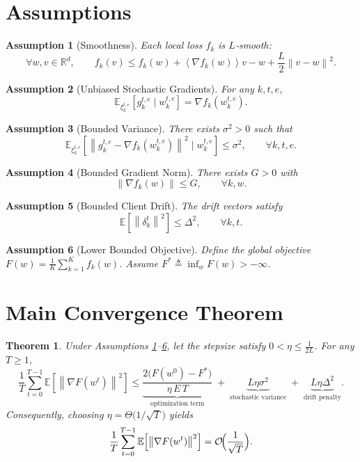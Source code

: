 \documentclass{article}
\newtheorem{theorem}{Theorem}
\newtheorem{assumption}{Assumption}
\newcommand{\E}{\mathbb{E}}
\newcommand{\norm}[1]{\left\lVert#1\right\rVert}
\newcommand{\inner}[1]{\left\langle#1\right\rangle}
\begin{document}
\section*{Assumptions}
\begin{assumption}[Smoothness]\label{ass:smooth}
Each local loss $f_{k}$ is $L$‑smooth:
\[
    \forall w,v\in\mathbb{R}^{d},\qquad
    f_{k}(v)\le f_{k}(w)+\inner{\nabla f_{k}(w)}{v-w}+ \frac{L}{2}\norm{v-w}^{2}.
\]
\end{assumption}

\begin{assumption}[Unbiased Stochastic Gradients]\label{ass:unbiased}
For any $k,t,e$,
\[
    \E_{\xi_{k}^{t,e}}\!\left[g_{k}^{t,e}\mid w_{k}^{t,e}\right]=\nabla f_{k}\!\left(w_{k}^{t,e}\right).
\]
\end{assumption}

\begin{assumption}[Bounded Variance]\label{ass:var}
There exists $\sigma^{2}>0$ such that
\[
    \E_{\xi_{k}^{t,e}}\!\left[\norm{g_{k}^{t,e}-\nabla f_{k}(w_{k}^{t,e})}^{2}\mid w_{k}^{t,e}\right]\le\sigma^{2},
    \qquad\forall k,t,e.
\]
\end{assumption}

\begin{assumption}[Bounded Gradient Norm]\label{ass:grad}
There exists $G>0$ with
\[
    \norm{\nabla f_{k}(w)}\le G,\qquad\forall k,w.
\]
\end{assumption}

\begin{assumption}[Bounded Client Drift]\label{ass:drift}
The drift vectors satisfy
\[
    \E\!\left[\norm{\delta_{k}^{t}}^{2}\right]\le \Delta^{2},
    \qquad\forall k,t.
\]
\end{assumption}

\begin{assumption}[Lower Bounded Objective]\label{ass:lower}
Define the global objective $F(w)=\frac1K\sum_{k=1}^{K}f_{k}(w)$.  Assume $F^{*}\triangleq\inf_{w}F(w)>-\infty$.
\end{assumption}

\section*{Main Convergence Theorem}
\begin{theorem}\label{thm:main}
Under Assumptions \ref{ass:smooth}--\ref{ass:lower}, let the stepsize satisfy $0<\eta\le\frac{1}{2L}$.  For any $T\ge1$,
\[
\frac{1}{T}\sum_{t=0}^{T-1}\E\!\left[\norm{\nabla F(w^{t})}^{2}\right]
\le
\underbrace{\frac{2\bigl(F(w^{0})-F^{*}\bigr)}{\eta\,E\,T}}_{\text{optimization term}}
\;+\;
\underbrace{L\eta\sigma^{2}}_{\text{stochastic variance}}
\;+\;
\underbrace{L\eta\Delta^{2}}_{\text{drift penalty}}.
\]
Consequently, choosing $\eta = \Theta\!\bigl(1/\sqrt{T}\bigr)$ yields
\[
\frac{1}{T}\sum_{t=0}^{T-1}\E\!\left[\norm{\nabla F(w^{t})}^{2}\right]=\mathcal{O}\!\Bigl(\frac{1}{\sqrt{T}}\Bigr).
\]
\end{theorem}
\end{document}
